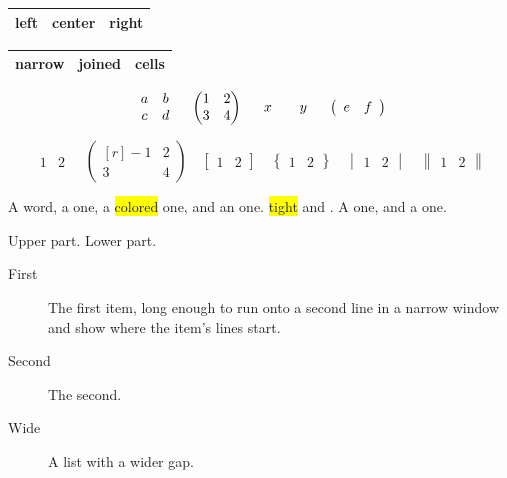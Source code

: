 \documentclass[11pt]{article}
\begin{document}
\begin{tabular}{|l|c|r|}
\hline
left & center & right \\
\hline
\end{tabular}

{\small\setlength\tabcolsep{2pt}
\begin{tabular}{|l@{}c|r|}
\hline
narrow & joined & cells \\
\hline
\end{tabular}}

\[ \begin{array}{cc} a & b \\ c & d \end{array}
   \quad \begin{pmatrix} 1 & 2 \\ 3 & 4 \end{pmatrix}
   \quad \begin{array}{c@{\hspace{2em}}c} x & y \end{array}
   \quad \left(\begin{array}{cc} e & f \end{array}\right) \]

\[ \begin{matrix*} 1 & 2 \end{matrix*}
   \quad \begin{pmatrix*}[r] -1 & 2 \\ 3 & 4 \end{pmatrix*}
   \quad \begin{bmatrix*} 1 & 2 \end{bmatrix*}
   \quad \begin{Bmatrix*} 1 & 2 \end{Bmatrix*}
   \quad \begin{vmatrix*} 1 & 2 \end{vmatrix*}
   \quad \begin{Vmatrix*} 1 & 2 \end{Vmatrix*} \]

A  word, a  one,
a \colorbox{yellow}{colored} one, and an  one.
{\setlength\fboxsep{0pt}\colorbox{yellow}{tight} and .}
{\small A  one, and a  one.}


\begin{tcolorbox}[middle=6pt]
Upper part.
\tcblower
Lower part.
\end{tcolorbox}

\begin{description}
\item[First] The first item, long enough to run onto a second line in a
narrow window and show where the item's lines start.
\item[Second] The second.
\end{description}

{\setlength{}
\begin{description}
\item[Wide] A list with a wider gap.
\end{description}}
\end{document}
